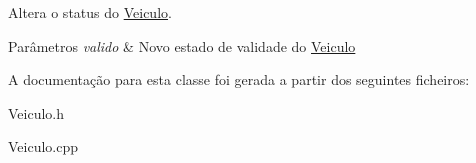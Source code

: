 Altera o status do \hyperlink{class_veiculo}{Veiculo}. 


\begin{DoxyParams}{Parâmetros}
{\em valido} & Novo estado de validade do \hyperlink{class_veiculo}{Veiculo} \\
\hline
\end{DoxyParams}


A documentação para esta classe foi gerada a partir dos seguintes ficheiros\-:\begin{DoxyCompactItemize}
\item 
Veiculo.\-h\item 
Veiculo.\-cpp\end{DoxyCompactItemize}
